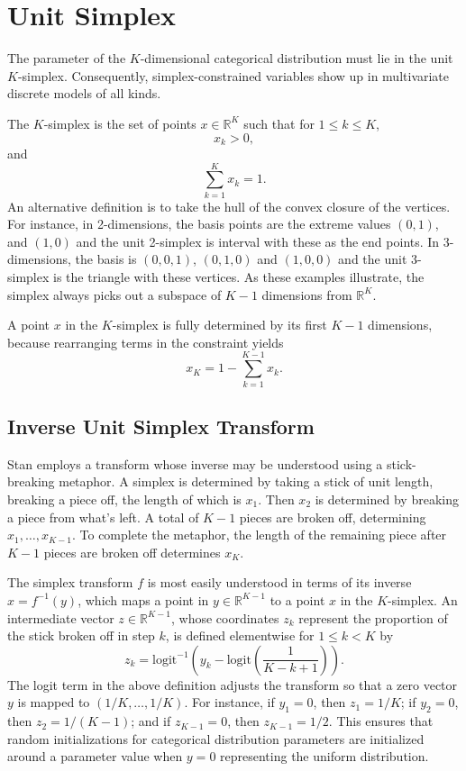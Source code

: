 \documentclass[10pt]{report}
\newcommand{\reals}{\mathbb{R}}
\begin{document}
\section{Unit Simplex}

The parameter of the $K$-dimensional categorical distribution must lie
in the unit $K$-simplex.  Consequently, simplex-constrained variables show
up in multivariate discrete models of all kinds.  

The $K$-simplex is the set of points $x \in \reals^K$ such that
for $1 \leq k \leq K$, 
\[ 
x_k > 0,
\] 
and
\[
\sum_{k=1}^K x_k = 1.
\]
%   
An alternative definition is to take the hull of the convex closure of
the vertices.  For instance, in 2-dimensions, the basis points are the
extreme values $(0,1)$, and $(1,0)$ and the unit 2-simplex is interval
with these as the end points.  In 3-dimensions, the basis is
$(0,0,1)$, $(0,1,0)$ and $(1,0,0)$ and the unit 3-simplex is the
triangle with these vertices.  As these examples illustrate, the
simplex always picks out a subspace of $K-1$ dimensions from
$\reals^K$.

A point $x$ in the $K$-simplex is fully determined by its first $K-1$
dimensions, because rearranging terms in the constraint yields
%
\[
x_K = 1 - \sum_{k=1}^{K-1} x_k.
\]
%

\subsection{Inverse Unit Simplex Transform}

Stan employs a transform whose inverse may be understood using a
stick-breaking metaphor.  A simplex is determined by taking a stick of
unit length, breaking a piece off, the length of which is $x_1$.  Then
$x_2$ is determined by breaking a piece from what's left.  A total of
$K-1$ pieces are broken off, determining $x_1,\ldots,x_{K-1}$.  To
complete the metaphor, the length of the remaining piece after $K-1$
pieces are broken off determines $x_K$.

The simplex transform $f$ is most easily understood in terms of its
inverse $x = f^{-1}(y)$, which maps a point in $y \in
\reals^{K-1}$ to a point $x$ in the $K$-simplex.  An intermediate
vector $z \in \reals^{K-1}$, whose coordinates $z_k$ represent 
the proportion of the stick broken off in step $k$, is defined
elementwise for $1 \leq k < K$ by
%
\[
z_k = \mbox{logit}^{-1} \left( y_k 
                             - \mbox{logit} \left( \frac{1}{K - k + 1}
                                            \right)
                       \right).
\]
%
The logit term in the above definition adjusts the transform so that a
zero vector $y$ is mapped to $(1/K,\ldots,1/K)$.  For instance, if
$y_1 = 0$, then $z_1 = 1/K$; if $y_2 = 0$, then $z_2 = 1/(K-1)$; and
if $z_{K-1} = 0$, then $z_{K-1} = 1/2$.  This ensures that random
initializations for categorical distribution parameters are
initialized around a parameter value when $y = 0$ representing the
uniform distribution.
\end{document}
